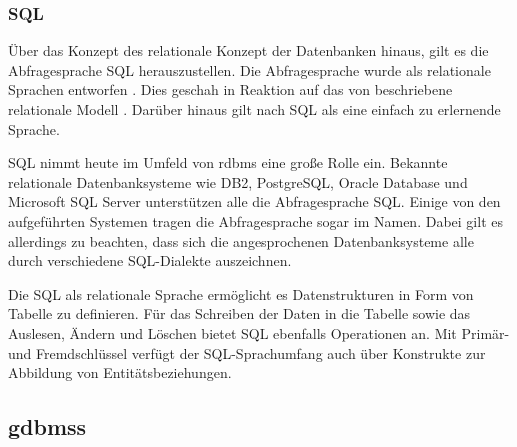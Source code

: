\subsubsection{SQL}
Über das Konzept des relationale Konzept der Datenbanken hinaus, gilt es die Abfragesprache SQL herauszustellen. Die Abfragesprache wurde als relationale Sprachen entworfen \cite{sql_history}. Dies geschah in Reaktion auf das von \citeauthor{codd_relational_model} beschriebene relationale Modell \cite{sql_history}. Darüber hinaus gilt nach \cite{sql_history} SQL als eine einfach zu erlernende Sprache. 

SQL nimmt heute im Umfeld von \acs{rdbms} eine große Rolle ein. Bekannte relationale Datenbanksysteme wie DB2, PostgreSQL, Oracle Database und Microsoft SQL Server unterstützen alle die Abfragesprache SQL. Einige von den aufgeführten Systemen tragen die Abfragesprache sogar im Namen. Dabei gilt es allerdings zu beachten, dass sich die angesprochenen Datenbanksysteme alle durch verschiedene SQL-Dialekte auszeichnen. 

Die SQL als relationale Sprache ermöglicht es Datenstrukturen in Form von Tabelle zu definieren. Für das Schreiben der Daten in die Tabelle sowie das Auslesen, Ändern und Löschen bietet SQL ebenfalls Operationen an. Mit Primär- und Fremdschlüssel verfügt der SQL-Sprachumfang auch über Konstrukte zur Abbildung von Entitätsbeziehungen. 

\subsection{\acl{gdbms}s}




